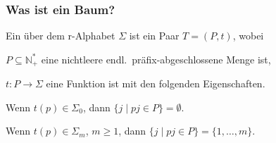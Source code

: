     \begin{frame}%
      \frametitle{Was ist ein Baum?}
      
      \begin{Definition}
        Ein  über dem r-Alphabet $\Sigma$ ist ein Paar $T = (P,t)$, wobei
        \begin{Enumerate}
          \item[\Bmph{(1)}]
            $P \subseteq \mathbb{N}_+^*$ eine nichtleere endl.\ präfix-abgeschlossene Menge ist,
          \item[\Bmph{(2)}]
            $t : P \to \Sigma$ eine Funktion ist mit den folgenden Eigenschaften.
            \begin{Enumerate}
              \item[\Bmph{(a)}]
                Wenn $t(p) \in \Sigma_0$, dann $\{j \mid pj \in P\} = \emptyset$.
              \item[\Bmph{(b)}]
                Wenn $t(p) \in \Sigma_m$, $m\geqslant 1$,
                dann $\{j \mid pj \in P\} = \{1,\dots,m\}$.
            \end{Enumerate}
        \end{Enumerate}
      \end{Definition}
      
      \par\medskip


    \end{frame}


